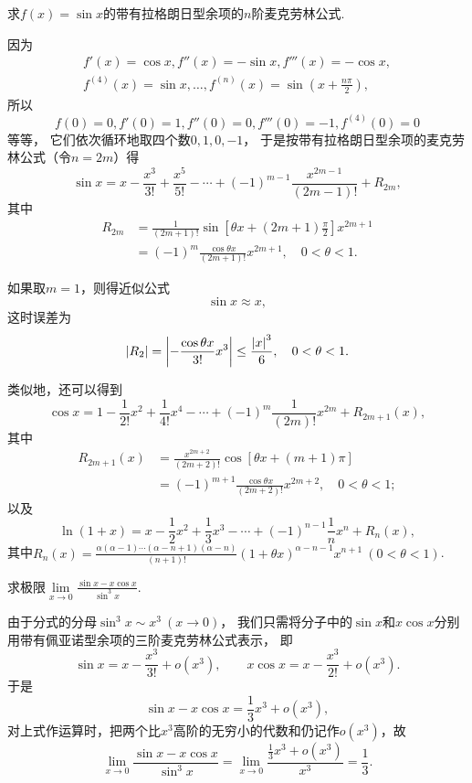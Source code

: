 \begin{example}
求\(f(x)=\sin x\)的带有拉格朗日型余项的\(n\)阶麦克劳林公式.
\begin{solution}
因为\[
	\begin{split}
		f'(x)=\cos x,
		f''(x)=-\sin x,
		f'''(x)=-\cos x, \\
		f^{(4)}(x)=\sin x,
		\dotsc,
		f^{(n)}(x)=\sin\left(x+\frac{n\pi}{2}\right),
	\end{split}
\]
所以\[
	f(0)=0,f'(0)=1,f''(0)=0,f'''(0)=-1,f^{(4)}(0)=0
\]等等，
它们依次循环地取四个数\(0,1,0,-1\)，
于是按带有拉格朗日型余项的麦克劳林公式（令\(n=2m\)）得\[
	\sin x = x - \frac{x^3}{3!} + \frac{x^5}{5!} - \dotsb + (-1)^{m-1} \frac{x^{2m-1}}{(2m-1)!} + R_{2m},
\]
其中\[
	\begin{split}
		R_{2m}
		&= \frac{1}{(2m+1)!} \sin\left[\theta x + (2m+1)\frac{\pi}{2}\right] x^{2m+1} \\
		&= (-1)^m \frac{\cos \theta x}{(2m+1)!} x^{2m+1},
		\quad 0<\theta<1.
	\end{split}
\]

如果取\(m=1\)，则得近似公式\[
	\sin x \approx x,
\]
这时误差为\[
	\abs{R_2} = \abs{-\frac{\cos \theta x}{3!} x^3}
	\leq \frac{\abs{x}^3}{6},
	\quad 0<\theta<1.
\]
\end{solution}
\end{example}

类似地，还可以得到\[
	\cos x
	= 1 - \frac{1}{2!} x^2
		+ \frac{1}{4!} x^4 - \dotsb
		+ (-1)^m \frac{1}{(2m)!} x^{2m}
		+ R_{2m+1}(x),
\]
其中\[
	\begin{split}
		R_{2m+1}(x)
		&= \frac{x^{2m+2}}{(2m+2)!} \cos\left[\theta x + (m+1)\pi\right] \\
		&= (-1)^{m+1} \frac{\cos \theta x}{(2m+2)!} x^{2m+2},
		\quad 0<\theta<1;
	\end{split}
\]
以及
\[
	\ln (1+x) = x - \frac{1}{2} x^2 + \frac{1}{3} x^3 - \dotsb
		+ (-1)^{n-1} \frac{1}{n} x^n + R_n(x),
\]
其中\(R_n(x) = \frac{\alpha(\alpha-1)\dotsm(\alpha-n+1)(\alpha-n)}{(n+1)!}
(1+\theta x)^{\alpha-n-1} x^{n+1}\ (0<\theta<1)\).

\begin{example}
求极限\(\lim\limits_{x\to0}\frac{\sin x - x \cos x}{\sin^3 x}\).
\begin{solution}
由于分式的分母\(\sin^3 x \sim x^3\ (x\to0)\)，
我们只需将分子中的\(\sin x\)和\(x \cos x\)分别用带有佩亚诺型余项的三阶麦克劳林公式表示，
即\[
	\sin x = x - \frac{x^3}{3!} + o(x^3),
	\qquad
	x \cos x = x - \frac{x^3}{2!} + o(x^3).
\]
于是\[
	\sin x - x \cos x = \frac{1}{3} x^3 + o(x^3),
\]
对上式作运算时，把两个比\(x^3\)高阶的无穷小的代数和仍记作\(o(x^3)\)，故\[
	\lim\limits_{x\to0}\frac{\sin x - x \cos x}{\sin^3 x}
	= \lim\limits_{x\to0}\frac{\frac{1}{3} x^3 + o(x^3)}{x^3} = \frac{1}{3}.
\]
\end{solution}
\end{example}

